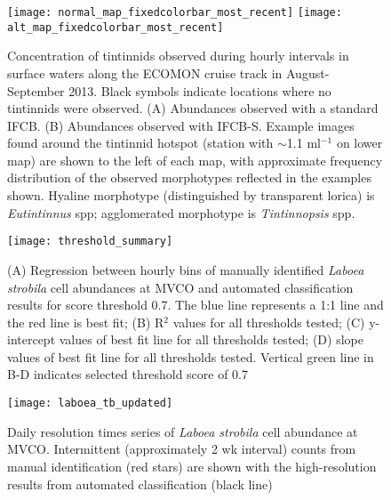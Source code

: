 \newpage
\begin{figure}

\graphicspath{ {Chapter2_Figures/} }
\texttt{[image: normal\_map\_fixedcolorbar\_most\_recent]}
\texttt{[image: alt\_map\_fixedcolorbar\_most\_recent]}
\caption [Tintinnid abundances observed on OKEX cruise between IFCB-S and a standard IFCB] {Concentration of tintinnids observed during hourly intervals in surface waters along the ECOMON cruise track in August-September 2013. Black symbols indicate locations where no tintinnids were observed. (A) Abundances observed with a standard IFCB. (B) Abundances observed with IFCB-S. Example images found around the tintinnid hotspot (station with $\sim$1.1 ml$^{-1}$ on lower map) are shown to the left of each map, with approximate frequency distribution of the observed morphotypes reflected in the examples shown. Hyaline morphotype (distinguished by transparent lorica) is \textit{Eutintinnus} spp; agglomerated morphotype is \textit{Tintinnopsis} spp.}
\label{arm:fig2}
\end{figure}

\begin{figure}

\graphicspath{ {Chapter2_Figures/} }
\texttt{[image: threshold\_summary]}
\caption [ Indicators for optimal threshold use in automated classification] {(A) Regression between hourly bins of manually identified  \textit{Laboea strobila} cell abundances at MVCO and automated
classification results for score threshold 0.7. The blue line represents a 1:1 line and the red line is best fit; (B) R$^{2}$ values for all thresholds tested; (C) y-intercept values of best fit line for all thresholds tested; (D) slope values of best fit line for all thresholds tested. Vertical green line in B-D indicates selected threshold score of 0.7}
\label{arm:fig2}
\end{figure}

\begin{figure}

\graphicspath{ {Chapter2_Figures/} }
\texttt{[image: laboea\_tb\_updated]}
\caption [Comparison between automated and manual classification for \textit{Laboea strobila}] {Daily resolution times series of \textit{Laboea strobila} cell abundance at MVCO. Intermittent (approximately 2 wk interval) counts from manual identification (red stars) are shown with the high-resolution results from automated classification (black line)}
\label{arm:fig2}
\end{figure}

